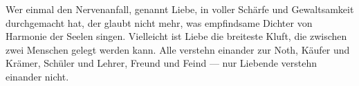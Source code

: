 Wer einmal den Nervenanfall, genannt Liebe, in voller Schärfe und Gewaltsamkeit durchgemacht hat, der glaubt nicht mehr, was empfindsame Dichter von Harmonie der Seelen singen. Vielleicht ist Liebe die breiteste Kluft, die zwischen zwei Menschen gelegt werden kann. Alle verstehn einander zur Noth, Käufer und Krämer, Schüler und Lehrer, Freund und Feind — nur Liebende verstehn einander nicht.
\par

